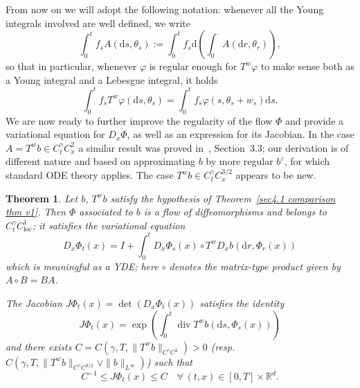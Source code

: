 \documentclass[10pt]{article}
\newcommand{\assign}{:=}
\newcommand{\comma}{{,}}
\newcommand{\mathd}{\mathrm{d}}
\newcommand{\tmop}[1]{\ensuremath{\operatorname{#1}}}
\newtheorem{theorem}{Theorem}
\begin{document}
From now on we will adopt the following notation: whenever all the Young
integrals involved are well defined, we write
\[ \int_0^t f_s A (\mathd s \comma \theta_s) \assign \int_0^t f_s \mathd
   \left( \int_0^{\cdot} A (\mathd r, \theta_r) \right), \]
so that in particular, whenever $\varphi$ is regular enough for $T^w \varphi$
to make sense both as a Young integral and a Lebesgue integral, it holds
\[ \int_0^t f_s T^w \varphi (\mathd s \comma \theta_s) = \int_0^t f_s \varphi
   (s, \theta_s + w_s) \mathd s. \]
We are now ready to further improve the regularity of the flow $\Phi$ and
provide a variational equation for $D_x \Phi$, as well as an expression for
its Jacobian. In the case $A = T^w b \in C^{\gamma}_t C^2_x$ a similar result
was proved in~{\cite{hu}}, Section~3.3; our derivation is of different nature
and based on approximating $b$ by more regular $b^{\varepsilon}$, for which
standard ODE theory applies. The case $T^w b \in C^{\gamma}_t C^{3 / 2}_x$
appears to be new.

\begin{theorem}
  \label{sec4.3 thm variational equation}Let $b$, $T^w b$ satisfy the
  hypothesis of Theorem~\ref{sec4.1 comparison thm v1}. Then $\Phi$ associated
  to $b$ is a flow of diffeomorphisms and belongs to $C^{\gamma}_t
  C^1_{\tmop{loc}}$; it satisfies the variational equation
  \begin{equation}
    D_x \Phi_t (x) = I + \int_0^t D_x \Phi_s (x) \circ T^w D_x b (\mathd r,
    \Phi_r (x)) \label{sec4.3 variational equation}
  \end{equation}
  which is meaningful as a YDE; here $\circ$ denotes the matrix-type product
  given by $A \circ B = B A$.
  
  The Jacobian $J \Phi_t (x) = \det (D_x \Phi_t (x))$ satisfies the identity
  \begin{equation}
    J \Phi_t (x) = \exp \left( \int_0^t \tmop{div} T^w b (\mathd s, \Phi_s
    (x)) \right) \label{sec4.3 jacobian equation}
  \end{equation}
  and there exists $C = C (\gamma, T, \| T^w b \|_{C^{\gamma} C^2})
  > 0$ (resp. $C (\gamma, T, \| T^w b \|_{C^{\gamma} C^{3 / 2}} \vee \| b
  \|_{L^{\infty}})$) such that
  \[ C^{- 1} \leqslant J \Phi_t (x) \leqslant C \quad \forall \, (t, x) \in
     [0, T] \times \mathbb{R}^d . \]
\end{theorem}
\end{document}
